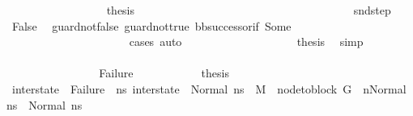 \begin{isabellebody}
\ \ \ \ \ \ \ \ \ \ \ \ \ \ \ \ \isamarkupfalse%
\ {\isacharquery}{\kern0pt}thesis\isanewline
\ \ \ \ \ \ \ \ \ \ \ \ \ \ \ \ \isamarkupfalse%
\ {\isacharminus}{\kern0pt}\isanewline
\ \ \ \ \ \ \ \ \ \ \ \ \ \ \ \ \ \ \isamarkupfalse%
\ snd{\isacharunderscore}{\kern0pt}step\ \isamarkupfalse%
\ False\ \isamarkupfalse%
\ guard{\isacharunderscore}{\kern0pt}not{\isacharunderscore}{\kern0pt}false{}\ guard{\isacharunderscore}{\kern0pt}not{\isacharunderscore}{\kern0pt}true{}\ bb{\isacharunderscore}{\kern0pt}successor{\isacharunderscore}{\kern0pt}if\ Some\ {}\ \isanewline
\ \ \ \ \ \ \ \ \ \ \ \ \ \ \ \ \ \ \ \ \isamarkupfalse%
\ {\isacharparenleft}{\kern0pt}cases{\isacharparenright}{\kern0pt}\ auto\isanewline
\ \ \ \ \ \ \ \ \ \ \ \ \ \ \ \ \ \ \isamarkupfalse%
\ {\isacharquery}{\kern0pt}thesis\ \isamarkupfalse%
\ simp\isanewline
\ \ \ \ \ \ \ \ \ \ \ \ \ \ \ \ \isamarkupfalse%
\isanewline
\ \ \ \ \ \ \ \ \ \ \ \ \ \ \isamarkupfalse%
\ \ \isanewline
\ \ \ \ \ \ \ \ \ \ \ \ \isamarkupfalse%
\ \isanewline
\ \ \ \ \ \ \ \ \ \ \isamarkupfalse%
\isanewline
\ \ \ \ \ \ \ \ \isamarkupfalse%
\isanewline
\ \ \ \ \ \ \isamarkupfalse%
\isanewline
\ \ \ \ \ \ \ \ \isamarkupfalse%
\ Failure\isanewline
\ \ \ \ \ \ \ \ \isamarkupfalse%
\ \isamarkupfalse%
\ {\isacharquery}{\kern0pt}thesis\isanewline
\ \ \ \ \ \ \ \ \ \ \isamarkupfalse%
\ {\isacartoucheopen}inter{\isacharunderscore}{\kern0pt}state\ {\isasymnoteq}\ Failure\ {\isasymand}\ {\isacharparenleft}{\kern0pt}{\isasymforall}ns{}{\isacharprime}{\kern0pt}{\isachardot}{\kern0pt}\ inter{\isacharunderscore}{\kern0pt}state\ {\isacharequal}{\kern0pt}\ Normal\ ns{}{\isacharprime}{\kern0pt}\ {\isasymlongrightarrow}\ M{\isacharcomma}{\kern0pt}{\isasymLambda}{\isacharcomma}{\kern0pt}{\isasymGamma}{\isacharcomma}{\kern0pt}{\isasymOmega}\ {\isasymturnstile}\ {\isasymlangle}{\isacharparenleft}{\kern0pt}node{\isacharunderscore}{\kern0pt}to{\isacharunderscore}{\kern0pt}block\ G\ {\isacharbang}{\kern0pt}\ n{\isacharparenright}{\kern0pt}{\isacharcomma}{\kern0pt}Normal\ ns{}{\isasymrangle}\ {\isacharbrackleft}{\kern0pt}{\isasymrightarrow}{\isacharbrackright}{\kern0pt}\ Normal\ ns{}{\isacharprime}{\kern0pt}{\isacharparenright}{\kern0pt}{\isacartoucheclose}\ \isanewline

\end{isabellebody}
